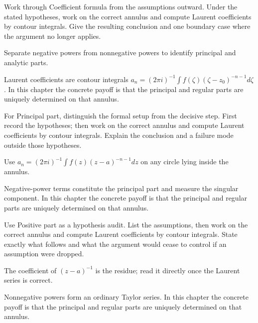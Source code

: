 \begin{exercise}\label{exr:iv08-03}
Work through Coefficient formula from the assumptions outward. Under the stated hypotheses, work on the correct annulus and compute Laurent coefficients by contour integrals. Give the resulting conclusion and one boundary case where the argument no longer applies.
\end{exercise}
\begin{hint}
Separate negative powers from nonnegative powers to identify principal and analytic parts.
\end{hint}
\begin{solution}
Laurent coefficients are contour integrals $a_n=(2\pi i)^{-1}\int f(\zeta)(\zeta-z_0)^{-n-1}d\zeta$. In this chapter the concrete payoff is that the principal and regular parts are uniquely determined on that annulus.
\end{solution}

\begin{exercise}\label{exr:iv08-04}
For Principal part, distinguish the formal setup from the decisive step. First record the hypotheses; then work on the correct annulus and compute Laurent coefficients by contour integrals. Explain the conclusion and a failure mode outside those hypotheses.
\end{exercise}
\begin{hint}
Use \(a_n=(2\pi i)^{-1}\int f(z)(z-a)^{-n-1}dz\) on any circle lying inside the annulus.
\end{hint}
\begin{solution}
Negative-power terms constitute the principal part and measure the singular component. In this chapter the concrete payoff is that the principal and regular parts are uniquely determined on that annulus.
\end{solution}

\begin{exercise}\label{exr:iv08-05}
Use Positive part as a hypothesis audit. List the assumptions, then work on the correct annulus and compute Laurent coefficients by contour integrals. State exactly what follows and what the argument would cease to control if an assumption were dropped.
\end{exercise}
\begin{hint}
The coefficient of \((z-a)^{-1}\) is the residue; read it directly once the Laurent series is correct.
\end{hint}
\begin{solution}
Nonnegative powers form an ordinary Taylor series. In this chapter the concrete payoff is that the principal and regular parts are uniquely determined on that annulus.
\end{solution}

